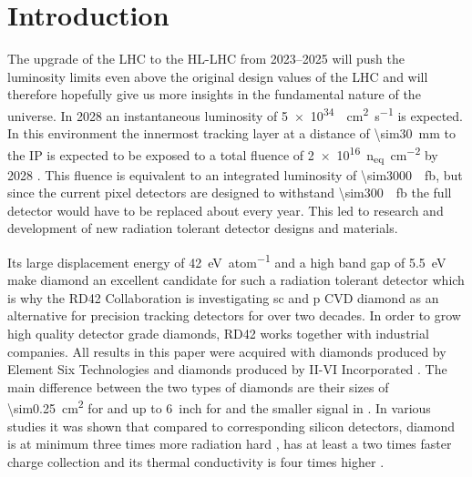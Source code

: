 \section{Introduction}
The upgrade of the \ac{LHC} to the \ac{HL-LHC} from \SIrange{2023}{2025}{} \cite{hllhc} will push the luminosity limits even above the original design values of the \ac{LHC} and will therefore hopefully give us more insights in the fundamental nature of the universe. In 2028 an instantaneous luminosity of \SI{5e34}{\per\centi\meter\squared\per\second} is expected. In this environment the innermost tracking layer at a distance of \SI{\sim30}{\milli\meter} to the \ac{IP}
is expected to be exposed to a total fluence of \SI{2e16}{n_{eq}\per \centi\meter^2} by 2028 \cite{auzinger}. This fluence is equivalent to an integrated luminosity of \SI{\sim3000}{\per\femto\barn}, but since the  current pixel detectors are designed to withstand \SI{\sim300}{\per\femto\barn} the full detector would have to be replaced about every year. This led to research and development of new radiation tolerant detector designs and materials.\par
Its large displacement energy of \SI{42}{\electronvolt\per atom} and a high band gap of \SI{5.5}{\electronvolt} make diamond an excellent candidate for such a radiation tolerant detector which is why the RD42 Collaboration is investigating \ac{sc} and \ac{p} \ac{CVD} diamond as an alternative for precision tracking detectors for over two decades. In order to grow high quality detector grade diamonds, RD42 works together with industrial companies. All results in this paper were acquired with \sccvd diamonds produced by Element Six Technologies \cite{e6} and \pcvd diamonds produced by II-VI Incorporated \cite{II6}. The main difference between the two types of diamonds are their sizes of \SI{\sim0.25}{\centi\meter\squared} for \sccvd and up to \SI{6}{inch} for \pcvd and the smaller signal in \pcvd \cite{felix}.
In various studies it was shown that compared to corresponding silicon detectors, diamond is at minimum three times more radiation hard \cite{deboer}, has at least a two times faster charge collection \cite{pernegger} and its thermal conductivity is four times higher \cite{zhao}.\par
